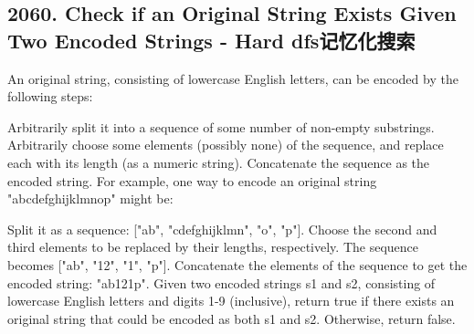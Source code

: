 \documentclass[9pt, b5paaper]{book}
\begin{document}

\subsection{2060. Check if an Original String Exists Given Two Encoded Strings - Hard dfs记忆化搜索}
\label{sec-1-0-5}
An original string, consisting of lowercase English letters, can be encoded by the following steps:

Arbitrarily split it into a sequence of some number of non-empty substrings.
Arbitrarily choose some elements (possibly none) of the sequence, and replace each with its length (as a numeric string).
Concatenate the sequence as the encoded string.
For example, one way to encode an original string "abcdefghijklmnop" might be:

Split it as a sequence: ["ab", "cdefghijklmn", "o", "p"].
Choose the second and third elements to be replaced by their lengths, respectively. The sequence becomes ["ab", "12", "1", "p"].
Concatenate the elements of the sequence to get the encoded string: "ab121p".
Given two encoded strings s1 and s2, consisting of lowercase English letters and digits 1-9 (inclusive), return true if there exists an original string that could be encoded as both s1 and s2. Otherwise, return false.
\end{document}
